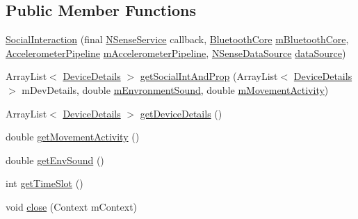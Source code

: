 \subsection*{Public Member Functions}
\begin{DoxyCompactItemize}
\item 
\hyperlink{classcs_1_1nsense_1_1inference_module_1_1_social_interaction_a879559f08942ea206b77f9cc3aa73424}{Social\-Interaction} (final \hyperlink{classcs_1_1nsense_1_1_n_sense_service}{N\-Sense\-Service} callback, \hyperlink{classcs_1_1nsense_1_1bluetooth_1_1_bluetooth_core}{Bluetooth\-Core} \hyperlink{classcs_1_1nsense_1_1inference_module_1_1_social_interaction_a8738fb102c15b3e5743b011ada07ccd5}{m\-Bluetooth\-Core}, \hyperlink{classcs_1_1nsense_1_1accelerometer_1_1_accelerometer_pipeline}{Accelerometer\-Pipeline} \hyperlink{classcs_1_1nsense_1_1inference_module_1_1_social_interaction_aa9213db0db3e17b869c53f146a8b29ac}{m\-Accelerometer\-Pipeline}, \hyperlink{classcs_1_1nsense_1_1db_1_1_n_sense_data_source}{N\-Sense\-Data\-Source} \hyperlink{classcs_1_1nsense_1_1inference_module_1_1_social_interaction_a1fee12b3051e148b656e1138932eeea4}{data\-Source})
\item 
Array\-List$<$ \hyperlink{classcs_1_1nsense_1_1inference_module_1_1_social_interaction_1_1_device_details}{Device\-Details} $>$ \hyperlink{classcs_1_1nsense_1_1inference_module_1_1_social_interaction_a93c802954e3774cb95abd8301786dda9}{get\-Social\-Int\-And\-Prop} (Array\-List$<$ \hyperlink{classcs_1_1nsense_1_1inference_module_1_1_social_interaction_1_1_device_details}{Device\-Details} $>$ m\-Dev\-Details, double \hyperlink{classcs_1_1nsense_1_1inference_module_1_1_social_interaction_a63536bd91de705c47a2ff24deff84f36}{m\-Envronment\-Sound}, double \hyperlink{classcs_1_1nsense_1_1inference_module_1_1_social_interaction_a82ce9d45646e36547602fb66bb866f27}{m\-Movement\-Activity})
\item 
Array\-List$<$ \hyperlink{classcs_1_1nsense_1_1inference_module_1_1_social_interaction_1_1_device_details}{Device\-Details} $>$ \hyperlink{classcs_1_1nsense_1_1inference_module_1_1_social_interaction_af1ba0f4db9496d3da8c800561ef50cd6}{get\-Device\-Details} ()
\item 
double \hyperlink{classcs_1_1nsense_1_1inference_module_1_1_social_interaction_adc9a69729d088ff2f40044c6374acf57}{get\-Movement\-Activity} ()
\item 
double \hyperlink{classcs_1_1nsense_1_1inference_module_1_1_social_interaction_a1758bb38e049536ad52fff2f03169d8d}{get\-Env\-Sound} ()
\item 
int \hyperlink{classcs_1_1nsense_1_1inference_module_1_1_social_interaction_adcd4945d5480be4458af9af07327993f}{get\-Time\-Slot} ()
\item 
void \hyperlink{classcs_1_1nsense_1_1inference_module_1_1_social_interaction_a48d93504f44a1bd6d8cef90193113b76}{close} (Context m\-Context)
\end{DoxyCompactItemize}
